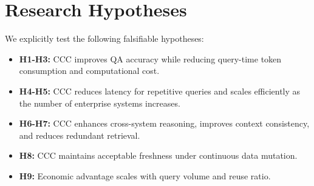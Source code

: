 \section{Research Hypotheses}
\label{sec:hypotheses}

We explicitly test the following falsifiable hypotheses:
\begin{itemize}
    \item \textbf{H1-H3:} CCC improves QA accuracy while reducing query-time token consumption and computational cost.
    \item \textbf{H4-H5:} CCC reduces latency for repetitive queries and scales efficiently as the number of enterprise systems increases.
    \item \textbf{H6-H7:} CCC enhances cross-system reasoning, improves context consistency, and reduces redundant retrieval.
    \item \textbf{H8:} CCC maintains acceptable freshness under continuous data mutation.
    \item \textbf{H9:} Economic advantage scales with query volume and reuse ratio.
\end{itemize}
